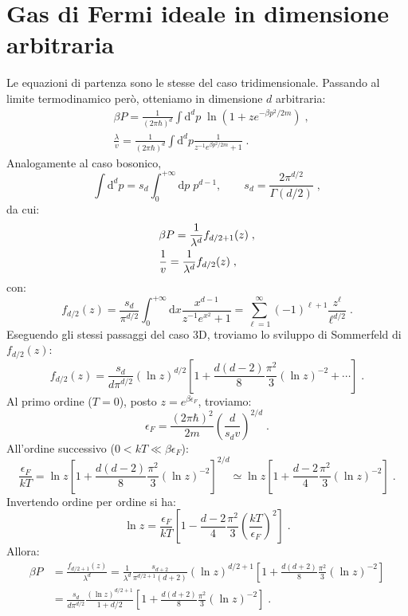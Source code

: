 \documentclass[10pt,a4paper]{report}
\theoremstyle{definition}
\numberwithin{equation}{section}
\newcommand{\diff}[1][]{\mathrm{d}#1}
\begin{document}
\section{Gas di Fermi ideale in dimensione arbitraria}
Le equazioni di partenza sono le stesse del caso tridimensionale. Passando al limite termodinamico però, otteniamo in dimensione $d$ arbitraria:
\begin{align}
&\beta P=\frac{1}{(2\pi\hbar)^d}\int\diff^d{p}\;\ln\left(1+ze^{-\beta p^2/2m}\right)\;, \\
&\frac{\lambda}{v}=\frac{1}{(2\pi\hbar)^d}\int\diff^d{p}\frac{1}{z^{-1}e^{\beta p^2/2m}+1}\;.
\end{align}
Analogamente al caso bosonico,
$$
\int\diff^d{p}=s_d\int_0^{+\infty}\diff{p}\; p^{d-1}, \qquad s_d=\frac{2\pi^{d/2}}{\Gamma(d/2)}\;,
$$
da cui:
\begin{align}
&\beta P=\frac{1}{\lambda^d}f_{d/2+1}(z) \notag\;, \\
&\frac{1}{v}=\frac{1}{\lambda^d}f_{d/2}(z)\;,
\end{align}
con:
\begin{equation}
f_{d/2}(z)=\frac{s_d}{\pi^{d/2}}\int_0^{+\infty}\diff{x}\frac{x^{d-1}}{z^{-1}e^{x^2}+1}=\sum_{\ell=1}^{\infty}(-1)^{\ell+1}\frac{z^{\ell}}{\ell^{d/2}}\;.
\end{equation}
Eseguendo gli stessi passaggi del caso 3D, troviamo lo sviluppo di Sommerfeld di $f_{d/2}(z)$:
\begin{equation}
f_{d/2}(z)=\frac{s_d}{d\pi^{d/2}}(\ln z)^{d/2}\left[1+\frac{d(d-2)}{8}\frac{\pi^2}{3}(\ln z)^{-2}+\cdots\right]\;.
\end{equation}
Al primo ordine ($T=0$), posto $z=e^{\beta\epsilon_F}$, troviamo:
\begin{equation}
\epsilon_F=\frac{(2\pi\hbar)^2}{2m}\left(\frac{d}{s_d v}\right)^{2/d}\;.
\end{equation}
All'ordine successivo ($0<kT\ll \beta\epsilon_F$):
\begin{equation}
\frac{\epsilon_F}{kT}=\ln z\left[1+\frac{d(d-2)}{8}\frac{\pi^2}{3}(\ln z)^{-2}\right]^{2/d}\simeq \ln z\left[1+\frac{d-2}{4}\frac{\pi^2}{3}(\ln z)^{-2}\right]\;.
\end{equation}
Invertendo ordine per ordine si ha:
\begin{equation}
\ln z=\frac{\epsilon_F}{kT}\left[1-\frac{d-2}{4}\frac{\pi^2}{3}\left(\frac{kT}{\epsilon_F}\right)^2\right]\;.
\end{equation}
Allora:
\begin{align*}
\beta P &= \frac{f_{d/2+1}(z)}{\lambda^d}=\frac{1}{\lambda^d}\frac{s_{d+2}}{\pi^{d/2+1}(d+2)}(\ln z)^{d/2+1}\left[1+\frac{d(d+2)}{8}\frac{\pi^2}{3}(\ln z)^{-2}\right] \\
&=\frac{s_d}{d\pi^{d/2}}\frac{(\ln z)^{d/2+1}}{1+d/2}\left[1+\frac{d(d+2)}{8}\frac{\pi^2}{3}(\ln z)^{-2}\right]\;.
\end{align*}
\end{document}
